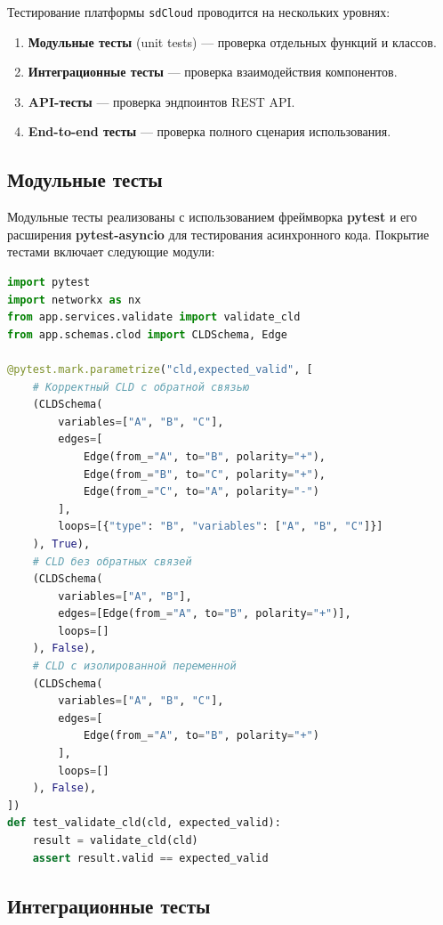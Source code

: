 Тестирование платформы \texttt{sdCloud} проводится на нескольких уровнях:

\begin{enumerate}
    \item \textbf{Модульные тесты} (unit tests) --- проверка отдельных функций и классов.
    \item \textbf{Интеграционные тесты} --- проверка взаимодействия компонентов.
    \item \textbf{API-тесты} --- проверка эндпоинтов REST API.
    \item \textbf{End-to-end тесты} --- проверка полного сценария использования.
\end{enumerate}

\subsection{Модульные тесты}

Модульные тесты реализованы с использованием фреймворка \textbf{pytest} и его расширения \textbf{pytest-asyncio} для тестирования асинхронного кода. Покрытие тестами включает следующие модули:

\begin{lstlisting}[caption={Пример модульного теста валидации CLD}, language=Python, basicstyle=\ttfamily\scriptsize]
import pytest
import networkx as nx
from app.services.validate import validate_cld
from app.schemas.clod import CLDSchema, Edge

@pytest.mark.parametrize("cld,expected_valid", [
    # Корректный CLD с обратной связью
    (CLDSchema(
        variables=["A", "B", "C"],
        edges=[
            Edge(from_="A", to="B", polarity="+"),
            Edge(from_="B", to="C", polarity="+"),
            Edge(from_="C", to="A", polarity="-")
        ],
        loops=[{"type": "B", "variables": ["A", "B", "C"]}]
    ), True),
    # CLD без обратных связей
    (CLDSchema(
        variables=["A", "B"],
        edges=[Edge(from_="A", to="B", polarity="+")],
        loops=[]
    ), False),
    # CLD с изолированной переменной
    (CLDSchema(
        variables=["A", "B", "C"],
        edges=[
            Edge(from_="A", to="B", polarity="+")
        ],
        loops=[]
    ), False),
])
def test_validate_cld(cld, expected_valid):
    result = validate_cld(cld)
    assert result.valid == expected_valid
\end{lstlisting}

\subsection{Интеграционные тесты}

